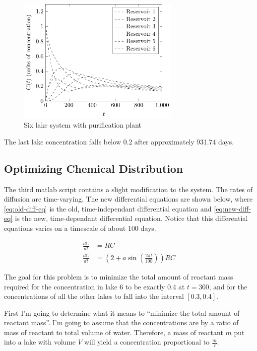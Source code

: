\documentclass{article}
\begin{document}
\begin{figure}[h!]
\includegraphics[width=0.7\textwidth]{figures/six-lakes-purification.pdf}
\caption{Six lake system with purification plant}
\label{fig:six-lakes-purification}
\end{figure}

The last lake concentration falls below 0.2 after approximately 931.74 days.

\subsection{Optimizing Chemical Distribution}

The third matlab script contains a slight modification to the system.
The rates of diffusion are time-varying.
The new differential equations are shown below, where \ref{eq:old-diff-eq}
	is the old, time-independant differential equation and \ref{eq:new-diff-eq}
	is the new, time-dependant differential equation.
Notice that this differential equations varies on a timescale of about 100 days.

\begin{align}
\frac{dC}{dt} & = R C \label{eq:old-diff-eq} \\
\frac{dC}{dt} & = \left(2 + a \sin \left(\frac{2 \pi t}{100}\right) \right) R C
	\label{eq:new-diff-eq}
\end{align}

The goal for this problem is to minimize the total amount of reactant mass
	required for the concentration in lake 6 to be exactly 0.4 at $t = 300$,
	and for the concentrations of all the other lakes to fall into the interval
	$[0.3, 0.4]$.

First I'm going to determine what it means to ``minimize the total amount of
	reactant mass''.
I'm going to assume that the concentrations are by a ratio of mass of reactant
	to total volume of water.
Therefore, a mass of reactant $m$ put into a lake with volume $V$ will yield
	a concentration proportional to $\frac{m}{V}$.
\end{document}
